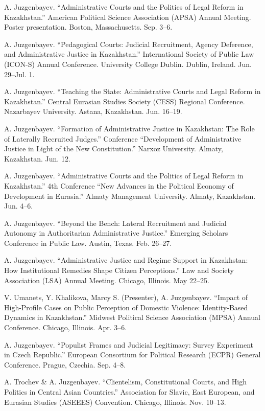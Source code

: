 \documentclass[11pt,letterpaper]{report}
\begin{document}
    \begin{tablist}
        \item[2026] \tab{}A. Juzgenbayev. \enquote{Administrative Courts and the Politics of Legal Reform in Kazakhstan.} American Political Science Association (APSA) Annual Meeting. Poster presentation. Boston, Massachusetts. Sep. 3--6.
        \item[2026] \tab{}A. Juzgenbayev. \enquote{Pedagogical Courts: Judicial Recruitment, Agency Deference, and Administrative Justice in Kazakhstan.} International Society of Public Law (ICON-S) Annual Conference. University College Dublin. Dublin, Ireland. Jun. 29--Jul. 1.
        \item[2026] \tab{}A. Juzgenbayev. \enquote{Teaching the State: Administrative Courts and Legal Reform in Kazakhstan.} Central Eurasian Studies Society (CESS) Regional Conference. Nazarbayev University. Astana, Kazakhstan. Jun. 16--19.
        \item[2026] \tab{}A. Juzgenbayev. \enquote{Formation of Administrative Justice in Kazakhstan: The Role of Laterally Recruited Judges.} Conference ``Development of Administrative Justice in Light of the New Constitution.'' Narxoz University. Almaty, Kazakhstan. Jun. 12.
        \item[2026] \tab{}A. Juzgenbayev. \enquote{Administrative Courts and the Politics of Legal Reform in Kazakhstan.} 4th Conference ``New Advances in the Political Economy of Development in Eurasia.'' Almaty Management University. Almaty, Kazakhstan. Jun. 4--6.
        \item[2026] \tab{}A. Juzgenbayev. \enquote{Beyond the Bench: Lateral Recruitment and Judicial Autonomy in Authoritarian Administrative Justice.} Emerging Scholars Conference in Public Law. Austin, Texas. Feb. 26--27.
        \item[2025] \tab{}A. Juzgenbayev. \enquote{Administrative Justice and Regime Support in Kazakhstan: How Institutional Remedies Shape Citizen Perceptions.} Law and Society Association (LSA) Annual Meeting. Chicago, Illinois. May 22--25.
        \item[2025] \tab{}V. Umanets, Y. Khalikova, Marcy S. (Presenter), A. Juzgenbayev. \enquote{Impact of High-Profile Cases on Public Perception of Domestic Violence: Identity-Based Dynamics in Kazakhstan.} Midwest Political Science Association (MPSA) Annual Conference. Chicago, Illinois. Apr. 3--6.

        \item[2023] \tab{}A. Juzgenbayev. \enquote{Populist Frames and Judicial Legitimacy: Survey Experiment in Czech Republic.} European Consortium for Political Research (ECPR) General Conference. Prague, Czechia. Sep. 4--8.

        \item[2022] \tab{}A. Trochev \& A. Juzgenbayev. \enquote{Clientelism, Constitutional Courts, and High Politics in Central Asian Countries.} Association for Slavic, East European, and Eurasian Studies (ASEEES) Convention. Chicago, Illinois. Nov. 10--13.

    \end{tablist}
\end{document}
